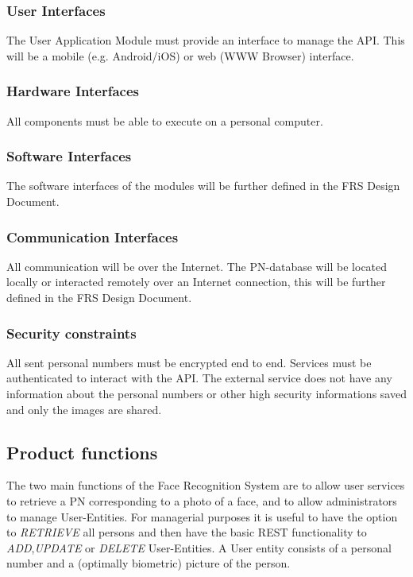 \documentclass[a4paper,11pt]{article}
\begin{document}
\subsubsection{User Interfaces} \label{User_Interfaces}
The User Application Module must provide an interface to manage the API. This will be a mobile (e.g. Android/iOS) or web (WWW Browser) interface.
\subsubsection{Hardware Interfaces}
All components must be able to execute on a personal computer.

\subsubsection{Software Interfaces}
The software interfaces of the modules will be further defined in the FRS Design Document.

\subsubsection{Communication Interfaces}
All communication will be over the Internet.
The PN-database will be located locally or interacted remotely over an Internet connection, this will be further defined in the FRS Design Document.

\subsubsection{Security constraints} \label{2.1.6 Security constraints}
All sent personal numbers must be encrypted end to end. Services must be authenticated to interact with the API. The external service does not have any information about the personal numbers or other high security informations saved and only the images are shared.

\subsection{Product functions} \label{ReqProductFunctions}
The two main functions of the Face Recognition System are to allow user services to retrieve a PN corresponding to a photo of a face, and to allow administrators to manage User-Entities.
\newline
\noindent
For managerial purposes it is useful to have the option to \textit{RETRIEVE} all persons and then have the basic REST functionality to \textit{ADD},\textit{UPDATE} or \textit{DELETE} User-Entities. A User entity consists of a personal number and a (optimally biometric) picture of the person.
\end{document}
